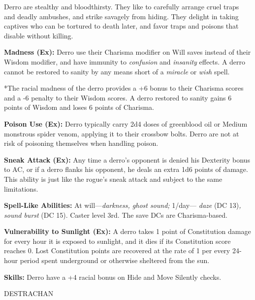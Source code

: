 \documentclass{article}
\begin{document}
Derro are stealthy and bloodthirsty. They like to carefully arrange cruel traps 
and deadly ambushes, and strike savagely from hiding. They delight in taking captives 
who can be tortured to death later, and favor traps and poisons that disable without 
killing.

\textbf{Madness (Ex):} Derro use their Charisma modifier on Will saves instead 
of their Wisdom modifier, and have immunity to \textit{confusion }and \textit{insanity 
}effects. A derro cannot be restored to sanity by any means short of a \textit{miracle 
}or \textit{wish }spell.

*The racial madness of the derro provides a +6 bonus to their Charisma scores and 
a -6 penalty to their Wisdom scores. A derro restored to sanity gains 6 points 
of Wisdom and loses 6 points of Charisma.

\textbf{Poison Use (Ex): }Derro typically carry 2d4 doses of greenblood oil or 
Medium monstrous spider venom, applying it to their crossbow bolts. Derro are not 
at risk of poisoning themselves when handling poison.

\textbf{Sneak Attack (Ex):} Any time a derro's opponent is denied his Dexterity 
bonus to AC, or if a derro flanks his opponent, he deals an extra 1d6 points of 
damage. This ability is just like the rogue's sneak attack and subject to the same 
limitations.

\textbf{Spell-Like Abilities: }At will---\textit{darkness, ghost sound; }1/day--- 
\textit{daze }(DC 13)\textit{, sound burst }(DC 15). Caster level 3rd. The save 
DCs are Charisma-based.

\textbf{Vulnerability to Sunlight (Ex):} A derro takes 1 point of Constitution 
damage for every hour it is exposed to sunlight, and it dies if its Constitution 
score reaches 0. Lost Constitution points are recovered at the rate of 1 per every 
24-hour period spent underground or otherwise sheltered from the sun.

\textbf{Skills:} Derro have a +4 racial bonus on Hide and Move Silently checks.

\vspace{12pt}
{\LARGE{}DESTRACHAN}
\end{document}
